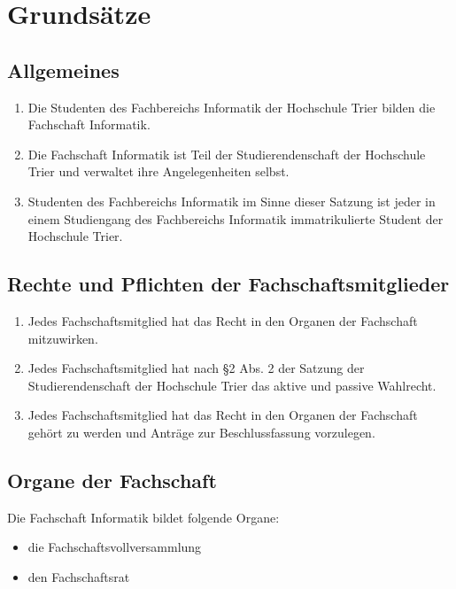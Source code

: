 \section{Grundsätze}

\subsection{Allgemeines}
\begin{enumerate}
	\item Die Studenten des Fachbereichs Informatik der Hochschule Trier bilden die Fachschaft Informatik.
	\item Die Fachschaft Informatik ist Teil der Studierendenschaft der Hochschule Trier und verwaltet ihre Angelegenheiten selbst.
	\item Studenten des Fachbereichs Informatik im Sinne dieser Satzung ist jeder in einem Studiengang des Fachbereichs Informatik immatrikulierte Student der Hochschule Trier.
\end{enumerate}

\subsection{Rechte und Pflichten der Fachschaftsmitglieder}
\label{par:rechte-und-pflichten}

\begin{enumerate}
	\item Jedes Fachschaftsmitglied hat das Recht in den Organen der Fachschaft mitzuwirken.
	\item Jedes Fachschaftsmitglied hat nach \S 2 Abs. 2 der Satzung der Studierendenschaft der Hochschule Trier das aktive und passive Wahlrecht.
	\item Jedes Fachschaftsmitglied hat das Recht in den Organen der Fachschaft gehört zu werden und Anträge zur Beschlussfassung vorzulegen.
\end{enumerate}

\subsection{Organe der Fachschaft}
Die Fachschaft Informatik bildet folgende Organe:

\begin{itemize}
	\item die Fachschaftsvollversammlung
	\item den Fachschaftsrat
\end{itemize}
